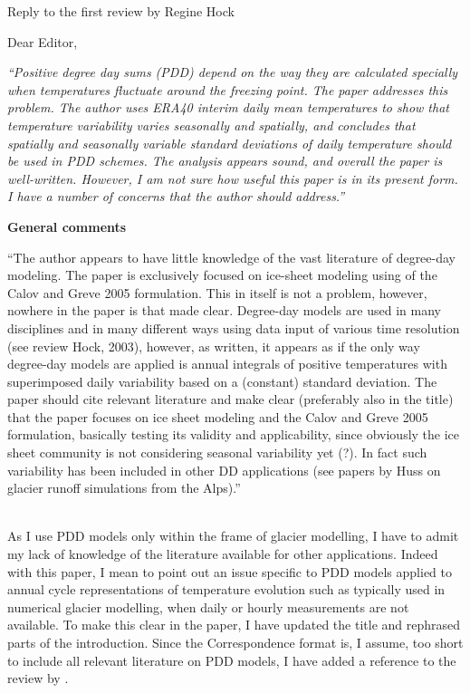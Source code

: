 \documentclass{letter}
\newcommand{\rev}[0]{\color{blue!50!black}\it}
\newcommand{\textrev}[1]{{\rev``#1''}}
\newcommand{\revpoint}[1]{{\rev\item``#1''}\\}
\begin{document}
\begin{letter}{Reply to the first review by Regine Hock}

\opening{Dear Editor,}

\textrev{Positive degree day sums (PDD) depend on the way they are calculated specially when temperatures fluctuate around the freezing point. The paper addresses this problem. The author uses ERA40 interim daily mean temperatures to show that temperature variability varies seasonally and spatially, and concludes that spatially and seasonally variable standard deviations of daily temperature should be used in PDD schemes. The analysis appears sound, and overall the paper is well-written. However, I am not sure how useful this paper is in its present form. I have a number of concerns that the author should address.}


\textbf{General comments}

\begin{enumerate}[resume]

    \revpoint{The author appears to have little knowledge of the vast literature of degree-day modeling. The paper is exclusively focused on ice-sheet modeling using of the Calov and Greve 2005 formulation. This in itself is not a problem, however, nowhere in the paper is that made clear. Degree-day models are used in many disciplines and in many different ways using data input of various time resolution (see review Hock, 2003), however, as written, it appears as if the only way degree-day models are applied is annual integrals of positive temperatures with superimposed daily variability based on a (constant) standard deviation. The paper should cite relevant literature and make clear (preferably also in the title) that the paper focuses on ice sheet modeling and the Calov and Greve 2005 formulation, basically testing its validity and applicability, since obviously the ice sheet community is not considering seasonal variability yet (?). In fact such variability has been included in other DD applications (see papers by Huss on glacier runoff simulations from the Alps).}

    As I use PDD models only within the frame of glacier modelling, I have to admit my lack of knowledge of the literature available for other applications. Indeed with this paper, I mean to point out an issue specific to PDD models applied to annual cycle representations of temperature evolution such as typically used in numerical glacier modelling, when daily or hourly measurements are not available. To make this clear in the paper, I have updated the title and rephrased parts of the introduction. Since the Correspondence format is, I assume, too short to include all relevant literature on PDD models, I have added a reference to the review by \citet{hock-2003}.


\end{enumerate}
\end{letter}
\end{document}
